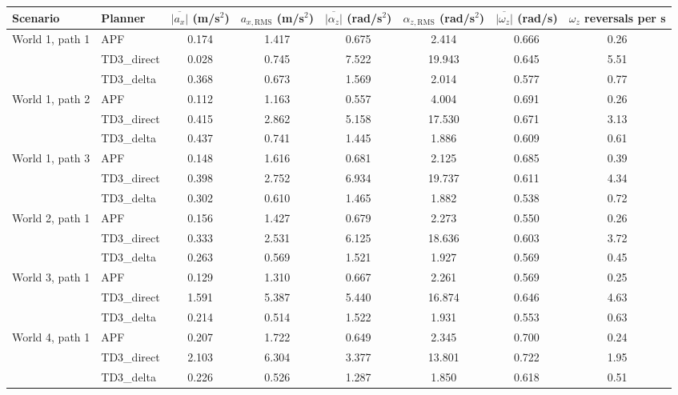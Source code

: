 \begin{tabular}{llcccccc}
\midrule[1.5pt]
\textbf{Scenario} & \textbf{Planner} & \makecell{$\overline{|a_x|}$\\(m/s$^2$)} & \makecell{$a_{x,\text{RMS}}$\\(m/s$^2$)} & \makecell{$\overline{|\alpha_z|}$\\(rad/s$^2$)} & \makecell{$\alpha_{z,\text{RMS}}$\\(rad/s$^2$)} & \makecell{$\overline{|\omega_z|}$\\(rad/s)} & \makecell{$\omega_z$ reversals\\per s} \\
\midrule[1.5pt]
\multirow{3}{*}{World 1, path 1} & APF & 0.174 & 1.417 & 0.675 & 2.414 & 0.666 & 0.26 \\
 & TD3\_direct & 0.028 & 0.745 & 7.522 & 19.943 & 0.645 & 5.51 \\
 & TD3\_delta & 0.368 & 0.673 & 1.569 & 2.014 & 0.577 & 0.77 \\
\midrule
\multirow{3}{*}{World 1, path 2} & APF & 0.112 & 1.163 & 0.557 & 4.004 & 0.691 & 0.26 \\
 & TD3\_direct & 0.415 & 2.862 & 5.158 & 17.530 & 0.671 & 3.13 \\
 & TD3\_delta & 0.437 & 0.741 & 1.445 & 1.886 & 0.609 & 0.61 \\
\midrule
\multirow{3}{*}{World 1, path 3} & APF & 0.148 & 1.616 & 0.681 & 2.125 & 0.685 & 0.39 \\
 & TD3\_direct & 0.398 & 2.752 & 6.934 & 19.737 & 0.611 & 4.34 \\
 & TD3\_delta & 0.302 & 0.610 & 1.465 & 1.882 & 0.538 & 0.72 \\
\midrule
\multirow{3}{*}{World 2, path 1} & APF & 0.156 & 1.427 & 0.679 & 2.273 & 0.550 & 0.26 \\
 & TD3\_direct & 0.333 & 2.531 & 6.125 & 18.636 & 0.603 & 3.72 \\
 & TD3\_delta & 0.263 & 0.569 & 1.521 & 1.927 & 0.569 & 0.45 \\
\midrule
\multirow{3}{*}{World 3, path 1} & APF & 0.129 & 1.310 & 0.667 & 2.261 & 0.569 & 0.25 \\
 & TD3\_direct & 1.591 & 5.387 & 5.440 & 16.874 & 0.646 & 4.63 \\
 & TD3\_delta & 0.214 & 0.514 & 1.522 & 1.931 & 0.553 & 0.63 \\
\midrule
\multirow{3}{*}{World 4, path 1} & APF & 0.207 & 1.722 & 0.649 & 2.345 & 0.700 & 0.24 \\
 & TD3\_direct & 2.103 & 6.304 & 3.377 & 13.801 & 0.722 & 1.95 \\
 & TD3\_delta & 0.226 & 0.526 & 1.287 & 1.850 & 0.618 & 0.51 \\
\midrule[1.5pt]
\end{tabular}
